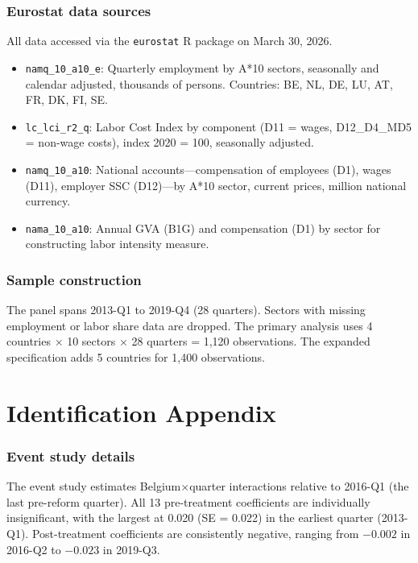 \documentclass[12pt]{article}
\begin{document}
\subsubsection*{Eurostat data sources} All data accessed via the \texttt{eurostat} R package on March 30, 2026.

\begin{itemize}
\item \texttt{namq\_10\_a10\_e}: Quarterly employment by A*10 sectors, seasonally and calendar adjusted, thousands of persons. Countries: BE, NL, DE, LU, AT, FR, DK, FI, SE.
\item \texttt{lc\_lci\_r2\_q}: Labor Cost Index by component (D11 = wages, D12\_D4\_MD5 = non-wage costs), index 2020 = 100, seasonally adjusted.
\item \texttt{namq\_10\_a10}: National accounts---compensation of employees (D1), wages (D11), employer SSC (D12)---by A*10 sector, current prices, million national currency.
\item \texttt{nama\_10\_a10}: Annual GVA (B1G) and compensation (D1) by sector for constructing labor intensity measure.
\end{itemize}

\subsubsection*{Sample construction} The panel spans 2013-Q1 to 2019-Q4 (28 quarters). Sectors with missing employment or labor share data are dropped. The primary analysis uses 4 countries $\times$ 10 sectors $\times$ 28 quarters = 1,120 observations. The expanded specification adds 5 countries for 1,400 observations.

\section{Identification Appendix}

\subsubsection*{Event study details} The event study estimates Belgium$\times$quarter interactions relative to 2016-Q1 (the last pre-reform quarter). All 13 pre-treatment coefficients are individually insignificant, with the largest at 0.020 (SE = 0.022) in the earliest quarter (2013-Q1). Post-treatment coefficients are consistently negative, ranging from $-0.002$ in 2016-Q2 to $-0.023$ in 2019-Q3.
\end{document}

